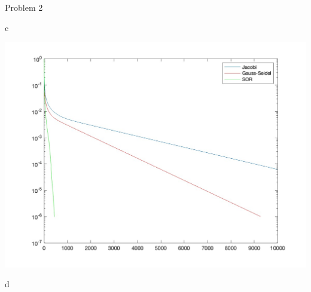 \begin{section}{Problem 2}
\begin{solution}{c}
        \continued

        \begin{mdframed}[]
            \includegraphics[scale=0.33]{DevamSisodraker_2c.jpg}
        \end{mdframed}
    \end{solution}

    \newpage
    
    \begin{solution}{d}
    \end{solution}

\end{section}